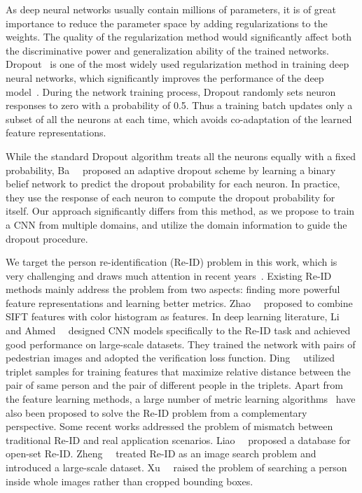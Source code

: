 As deep neural networks usually contain millions of parameters, it is of great importance to reduce the parameter space by adding regularizations to the weights. The quality of the regularization method would significantly affect both the discriminative power and generalization ability of the trained networks. Dropout~\cite{hinton2012improving} is one of the most widely used regularization method in training deep neural networks, which significantly improves the performance of the deep model~\cite{krizhevsky2012imagenet}. During the network training process, Dropout randomly sets neuron responses to zero with a probability of 0.5. Thus a training batch updates only a subset of all the neurons at each time, which avoids co-adaptation of the learned feature representations.

While the standard Dropout algorithm treats all the neurons equally with a fixed probability, Ba~\etal~\cite{ba2013adaptive} proposed an adaptive dropout scheme by learning a binary belief network to predict the dropout probability for each neuron. In practice, they use the response of each neuron to compute the dropout probability for itself. Our approach significantly differs from this method, as we propose to train a CNN from multiple domains, and utilize the domain information to guide the dropout procedure.

We target the person re-identification (Re-ID) problem in this work, which is very challenging and draws much attention in recent years~\cite{wang2007shape,li2015locality,zhang2015bit,xu2013human,liu2014fly,li2015multi}. Existing Re-ID methods mainly address the problem from two aspects: finding more powerful feature representations and learning better metrics. Zhao~\etal~\cite{zhao2013unsupervised,zhao2013person,zhao2014learning} proposed to combine SIFT features with color histogram as features. In deep learning literature, Li~\etal~\cite{li2014deepreid} and Ahmed~\etal~\cite{ahmed2015improved} designed CNN models specifically to the Re-ID task and achieved good performance on large-scale datasets. They trained the network with pairs of pedestrian images and adopted the verification loss function. Ding~\etal~\cite{ding2015deep} utilized triplet samples for training features that maximize relative distance between the pair of same person and the pair of different people in the triplets. Apart from the feature learning methods, a large number of metric learning algorithms~\cite{paisitkriangkrai2015learning,weinberger2005distance,xiong2014person,davis2007information,mcfee2010metric,koestinger2012large} have also been proposed to solve the Re-ID problem from a complementary perspective. Some recent works addressed the problem of mismatch between traditional Re-ID and real application scenarios. Liao~\etal~\cite{liao2014open} proposed a database for open-set Re-ID. Zheng~\etal~\cite{zheng2015person} treated Re-ID as an image search problem and introduced a large-scale dataset. Xu~\etal~\cite{xu2014person} raised the problem of searching a person inside whole images rather than cropped bounding boxes.

